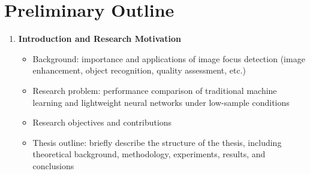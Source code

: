\section{Preliminary Outline}

\begin{enumerate}
      \item \textbf{Introduction and Research Motivation}
            \begin{itemize}
                  \item Background: importance and applications of image focus detection (image
                        enhancement, object recognition, quality assessment, etc.)
                  \item Research problem: performance comparison of traditional machine learning and
                        lightweight neural networks under low-sample conditions
                  \item Research objectives and contributions
                  \item Thesis outline: briefly describe the structure of the thesis, including
                        theoretical background, methodology, experiments, results, and conclusions
            \end{itemize}


\end{enumerate}
